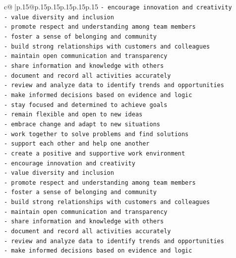 \documentclass{article}
\begin{document}
{\begin{supertabular}{c@{$\;$}|p{.15\linewidth}@{}p{.15\linewidth}p{.15\linewidth}p{.15\linewidth}p{.15\linewidth}p{.15\linewidth}}
{{{\texttt{{-} encourage innovation and creativity} \\
\texttt{{-} value diversity and inclusion} \\
\texttt{{-} promote respect and understanding among team members} \\
\texttt{{-} foster a sense of belonging and community} \\
\texttt{{-} build strong relationships with customers and colleagues} \\
\texttt{{-} maintain open communication and transparency} \\
\texttt{{-} share information and knowledge with others} \\
\texttt{{-} document and record all activities accurately} \\
\texttt{{-} review and analyze data to identify trends and opportunities} \\
\texttt{{-} make informed decisions based on evidence and logic} \\
\texttt{{-} stay focused and determined to achieve goals} \\
\texttt{{-} remain flexible and open to new ideas} \\
\texttt{{-} embrace change and adapt to new situations} \\
\texttt{{-} work together to solve problems and find solutions} \\
\texttt{{-} support each other and help one another} \\
\texttt{{-} create a positive and supportive work environment} \\
\texttt{{-} encourage innovation and creativity} \\
\texttt{{-} value diversity and inclusion} \\
\texttt{{-} promote respect and understanding among team members} \\
\texttt{{-} foster a sense of belonging and community} \\
\texttt{{-} build strong relationships with customers and colleagues} \\
\texttt{{-} maintain open communication and transparency} \\
\texttt{{-} share information and knowledge with others} \\
\texttt{{-} document and record all activities accurately} \\
\texttt{{-} review and analyze data to identify trends and opportunities} \\
\texttt{{-} make informed decisions based on evidence and logic} \\
}}}
\end{supertabular}}
\end{document}
